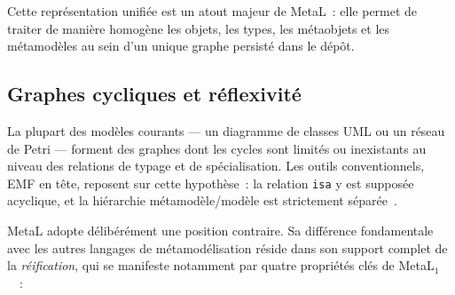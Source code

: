 Cette représentation unifiée est un atout majeur de MetaL~: elle permet de traiter de manière homogène les objets, les types, les métaobjets et les métamodèles au sein d'un unique graphe persisté dans le dépôt.

\subsection{Graphes cycliques et réflexivité}
\label{sec:graphes-cycliques}

La plupart des modèles courants --- un diagramme de classes UML ou un réseau de Petri --- forment des graphes dont les cycles sont limités ou inexistants au niveau des relations de typage et de spécialisation. Les outils conventionnels, EMF en tête, reposent sur cette hypothèse~: la relation \texttt{isa} y est supposée acyclique, et la hiérarchie métamodèle/modèle est strictement séparée~\cite{steinberg2008emf}.

MetaL adopte délibérément une position contraire. Sa différence fondamentale avec les autres langages de métamodélisation réside dans son support complet de la \textit{réification}, qui se manifeste notamment par quatre propriétés clés de MetaL$_1$~\cite{Eng2007}~:


